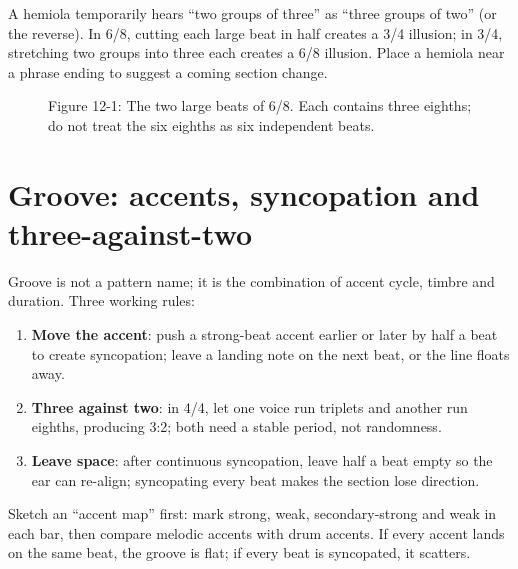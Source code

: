 A hemiola temporarily hears ``two groups of three'' as ``three groups of two'' (or the reverse). In 6/8, cutting each large beat in half creates a 3/4 illusion; in 3/4, stretching two groups into three each creates a 6/8 illusion. Place a hemiola near a phrase ending to suggest a coming section change.

\begin{figure}[htbp]
\centering
{}
\caption*{Figure 12-1: The two large beats of 6/8. Each contains three eighths; do not treat the six eighths as six independent beats.}
\end{figure}

\section{Groove: accents, syncopation and three-against-two}

Groove is not a pattern name; it is the combination of accent cycle, timbre and duration. Three working rules:

\begin{enumerate}
  \item \textbf{Move the accent}: push a strong-beat accent earlier or later by half a beat to create syncopation; leave a landing note on the next beat, or the line floats away.
  \item \textbf{Three against two}: in 4/4, let one voice run triplets and another run eighths, producing 3:2; both need a stable period, not randomness.
  \item \textbf{Leave space}: after continuous syncopation, leave half a beat empty so the ear can re-align; syncopating every beat makes the section lose direction.
\end{enumerate}

Sketch an ``accent map'' first: mark strong, weak, secondary-strong and weak in each bar, then compare melodic accents with drum accents. If every accent lands on the same beat, the groove is flat; if every beat is syncopated, it scatters.

